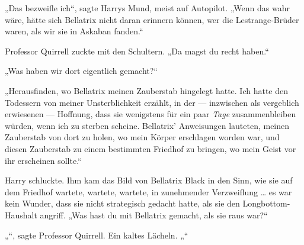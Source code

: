 „Das bezweifle ich“, sagte Harrys Mund, meist auf Autopilot.
„Wenn das wahr wäre, hätte sich Bellatrix nicht daran erinnern können, wer die Lestrange-Brüder waren, als wir sie in Askaban fanden.“

Professor Quirrell zuckte mit den Schultern.
„Da magst du recht haben.“

„Was haben wir dort eigentlich gemacht?“

„Herausfinden, wo Bellatrix meinen Zauberstab hingelegt hatte. Ich hatte den Todessern von meiner Unsterblichkeit erzählt, in der — inzwischen als vergeblich erwiesenen — Hoffnung, dass sie wenigstens für ein paar \emph{Tage} zusammenbleiben würden, wenn ich zu sterben scheine. Bellatrix’ Anweisungen lauteten, meinen Zauberstab von dort zu holen, wo mein Körper erschlagen worden war, und diesen Zauberstab zu einem bestimmten Friedhof zu bringen, wo mein Geist vor ihr erscheinen sollte.“

Harry schluckte. Ihm kam das Bild von Bellatrix Black in den Sinn, wie sie auf dem Friedhof wartete, wartete, wartete, in zunehmender Verzweiflung … es war kein Wunder, dass sie nicht strategisch gedacht hatte, als sie den Longbottom-Haushalt angriff.
„Was hast du mit Bellatrix gemacht, als sie raus war?“

„“, sagte Professor Quirrell. Ein kaltes Lächeln. „“

